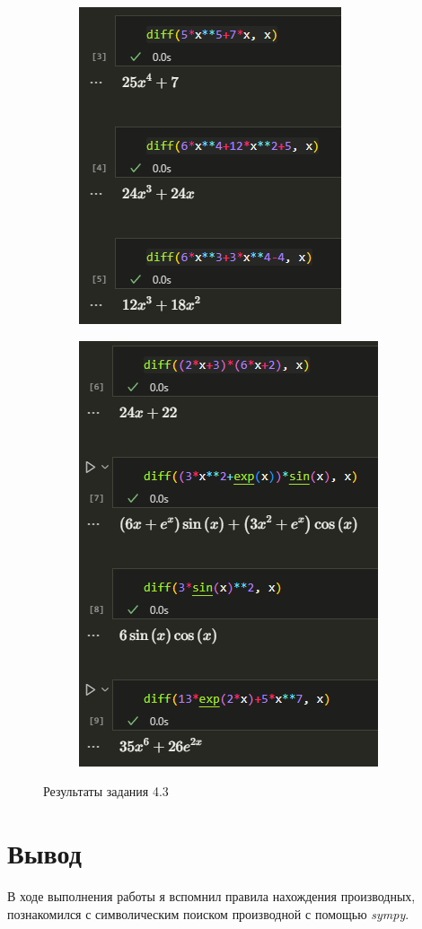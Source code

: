 \documentclass[14pt,a4paper]{extarticle}
\begin{document}
\newpage
\begin{figure}[ht!]
    \centering
    \begin{subfigure}{.5\textwidth}
        \centering
        \includegraphics[width=0.7\linewidth]{figures/3-1.png}
    \end{subfigure}%
    \begin{subfigure}{.5\textwidth}
        \centering
        \includegraphics[width=0.7\linewidth]{figures/3-2.png}
    \end{subfigure}%
    \caption{Результаты задания 4.3}
    \label{fig:4.3}
\end{figure}


\section*{Вывод}

        В ходе выполнения работы я вспомнил правила нахождения производных,
познакомился с символическим поиском производной с помощью \textit{sympy}.
\end{document}
